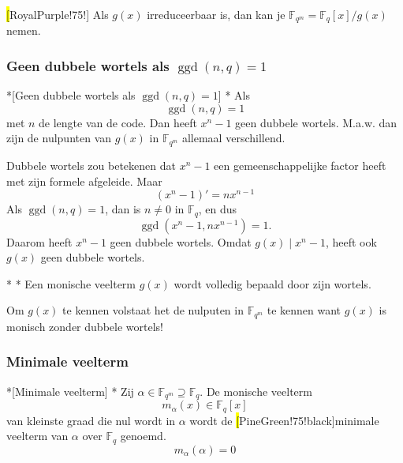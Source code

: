 \begin{barbox}[RoyalPurple!75][gray!3]
    \hl[RoyalPurple!75!]{} Als $g(x)$ irreduceerbaar is, dan kan je $\mathbb{F}_{q^m} = \mathbb{F}_q\left[x\right]/g(x)$ nemen. 
\end{barbox}

\subsubsection{Geen dubbele wortels als \texorpdfstring{$\operatorname{ggd}(n,q)=1$}{gcd(n,q)=1}}

\begin{nicefact}*[Geen dubbele wortels als $\operatorname{ggd}(n,q)=1$]
    \nextpart[]*
    Als
    \begin{equation*}
        \operatorname{ggd}(n,q)=1
    \end{equation*}
    met $n$ de lengte van de code. Dan heeft $x^n-1$ geen dubbele wortels. M.a.w. dan zijn de nulpunten van $g(x)$ in $\mathbb{F}_{q^m}$ allemaal verschillend.
\end{nicefact}

\textbf{} Dubbele wortels zou betekenen dat $x^n-1$ een gemeenschappelijke factor heeft met zijn formele afgeleide. Maar
\begin{equation*}
    (x^n-1)' = nx^{n-1}
\end{equation*}
Als $\operatorname{ggd}(n,q)=1$, dan is $n \neq 0$ in $\mathbb{F}_q$, en dus
\begin{equation*}
    \operatorname{ggd}(x^n-1, nx^{n-1}) = 1.
\end{equation*}
Daarom heeft $x^n-1$ geen dubbele wortels. Omdat $g(x) \mid x^n-1$, heeft ook $g(x)$ geen dubbele wortels.

\begin{nicecorollary}*
    \nextpart[]*
    Een monische veelterm $g(x)$ wordt volledig bepaald door zijn wortels.
    
    \vspace{0.25cm}

    Om $g(x)$ te kennen volstaat het de nulputen in $\mathbb{F}_{q^m}$ te kennen want $g(x)$ is monisch zonder dubbele wortels!
\end{nicecorollary}

\subsubsection{Minimale veelterm}

\begin{nicedefinition}*[Minimale veelterm]
    \nextpart[]*
    Zij $\alpha \in \mathbb{F}_{q^m} \supseteq \mathbb{F}_q$. De monische veelterm
    \begin{equation*}
        m_\alpha(x) \in \mathbb{F}_q\left[x\right]
    \end{equation*}
     van kleinste graad die nul wordt in $\alpha$ wordt de \hl[PineGreen!75!black]{minimale veelterm} van $\alpha$ over $\mathbb{F}_q$ genoemd.
    \begin{equation*}
        m_\alpha(\alpha) = 0
    \end{equation*}
\end{nicedefinition}

